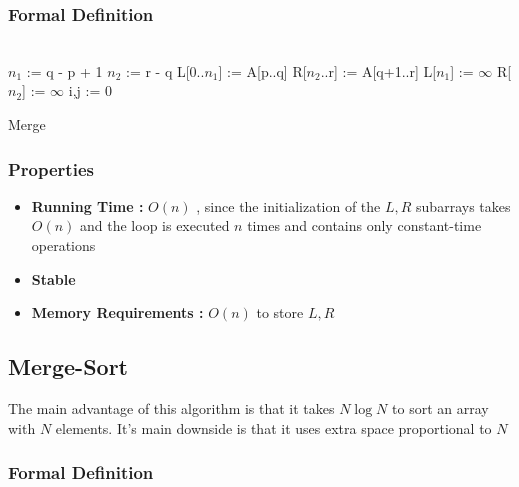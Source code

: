 \subsubsection{Formal Definition}

\begin{algorithm}[H]
	\DontPrintSemicolon
	\SetAlgoLined{}
	\\
	$n_1$ := q - p + 1{}\;
	$n_2$ := r - q\;
	L[0..$n_1$] := A[p..q]{}\;
	R[$n_2$..r] := A[q+1..r]\;
	L[$n_1$] := $\infty${}\;
	R[$n_2$] := $\infty$\;
	i,j := 0\;
		\caption{Merge}
\end{algorithm}

\subsubsection{Properties}

		\begin{itemize}
			\item\textbf{Running Time : } $O(n)$ , since the initialization of
the $L , R$ subarrays takes $O(n)$ and the loop is executed $n$ times and
contains only constant-time operations
			\item\textbf{Stable}
			\item\textbf{Memory Requirements : } $O(n)$ to store $L, R$	
		\end{itemize}

\subsection{Merge-Sort}

\par{The main advantage of this algorithm is that it takes $N \log N$ to sort an array with $N$ elements. It's main downside is that it uses extra space proportional to $N$}


\subsubsection{Formal Definition}

